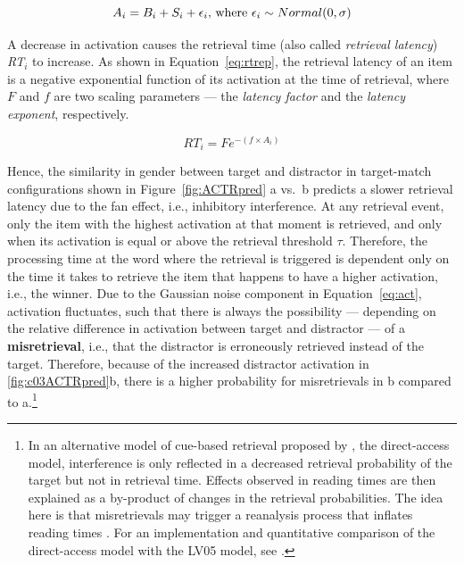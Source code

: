\documentclass{cambridge7A}\usepackage[]{graphicx}\usepackage[]{color}
\begin{document}
\begin{equation}
  A_i = B_i + S_i + \epsilon_i  \hbox{, where } \epsilon_i \sim Normal(0,\sigma)  \label{eq:act}
\end{equation}

A decrease in activation causes the retrieval time (also called  \emph{retrieval latency}) \textit{RT}$_i$ to increase. As shown in Equation~\ref{eq:rtrep}, the retrieval latency of an item is a negative exponential function of its activation at the time of retrieval, where $F$ and $f$ are two scaling parameters --- the  \emph{latency factor} and the  \emph{latency exponent}, respectively.

\begin{equation}
  \textit{RT}_i = Fe^{-(f\times A_i)} \label{eq:rtrep}
\end{equation}

Hence, the similarity in gender between target and distractor in target-match configurations shown in Figure~\ref{fig:ACTRpred} a vs.\ b predicts a slower retrieval latency due to the  fan effect, i.e., inhibitory interference. 
 At any retrieval event, only the item with the highest activation at that moment is retrieved, and only when its activation is equal or above the retrieval threshold $\tau$. Therefore, the processing time at the word where the retrieval is triggered is dependent only on the time it takes to retrieve the item that happens to have a higher activation, i.e., the winner.
Due to the Gaussian noise component in Equation~\ref{eq:act}, activation fluctuates, such that there is always the possibility --- depending on the relative difference in activation between target and distractor --- of a  \textbf{misretrieval}, i.e., that the distractor is erroneously retrieved instead of the target. 
Therefore, because of the increased distractor activation in \ref{fig:c03ACTRpred}b, there is a higher probability for misretrievals in b compared to a.\footnote{%
In an alternative model of cue-based retrieval proposed by \cite{McElree2006}, the direct-access model, interference is only reflected in a decreased retrieval probability of the target but not in retrieval time. 
  Effects observed in reading times are then explained as a by-product of changes in the retrieval probabilities. The idea here is that misretrievals may trigger a reanalysis process that inflates reading times \citep{McElree1993}. For an implementation and quantitative comparison of the direct-access model \citep{McElree2006} with the LV05 model, see \cite{NicenboimRetrieval2018}.}
\end{document}
